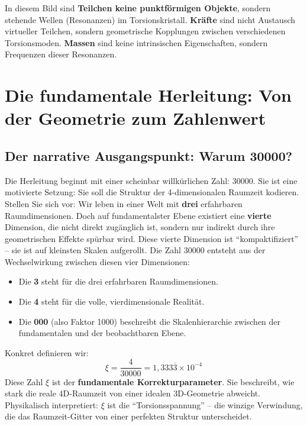 	In diesem Bild sind \textbf{Teilchen keine punktförmigen Objekte}, sondern stehende Wellen (Resonanzen) im Torsionskristall. \textbf{Kräfte} sind nicht Austausch virtueller Teilchen, sondern geometrische Kopplungen zwischen verschiedenen Torsionsmoden. \textbf{Massen} sind keine intrinsischen Eigenschaften, sondern Frequenzen dieser Resonanzen.
	
	\section{Die fundamentale Herleitung: Von der Geometrie zum Zahlenwert}
	\subsection{Der narrative Ausgangspunkt: Warum 30000?}
	Die Herleitung beginnt mit einer scheinbar willkürlichen Zahl: \(30000\). Sie ist eine motivierte Setzung: Sie soll die Struktur der 4-dimensionalen Raumzeit kodieren.
	Stellen Sie sich vor: Wir leben in einer Welt mit \textbf{drei} erfahrbaren Raumdimensionen. Doch auf fundamentalster Ebene existiert eine \textbf{vierte} Dimension, die nicht direkt zugänglich ist, sondern nur indirekt durch ihre geometrischen Effekte spürbar wird. Diese vierte Dimension ist \enquote{kompaktifiziert} -- sie ist auf kleinsten Skalen aufgerollt.
	Die Zahl \(30000\) entsteht aus der Wechselwirkung zwischen diesen vier Dimensionen:
	\begin{itemize}
		\item Die \textbf{3} steht für die drei erfahrbaren Raumdimensionen.
		\item Die \textbf{4} steht für die volle, vierdimensionale Realität.
		\item Die \textbf{000} (also Faktor 1000) beschreibt die Skalenhierarchie zwischen der fundamentalen und der beobachtbaren Ebene.
	\end{itemize}
	Konkret definieren wir:
	\begin{equation}
		\boxed{\xi = \frac{4}{30000} = 1{,}333\overline{3} \times 10^{-4}}
	\end{equation}
	Diese Zahl \(\xi\) ist der \textbf{fundamentale Korrekturparameter}. Sie beschreibt, wie stark die reale 4D-Raumzeit von einer idealen 3D-Geometrie abweicht. Physikalisch interpretiert: \(\xi\) ist die \enquote{Torsionsspannung} -- die winzige Verwindung, die das Raumzeit-Gitter von einer perfekten Struktur unterscheidet.
